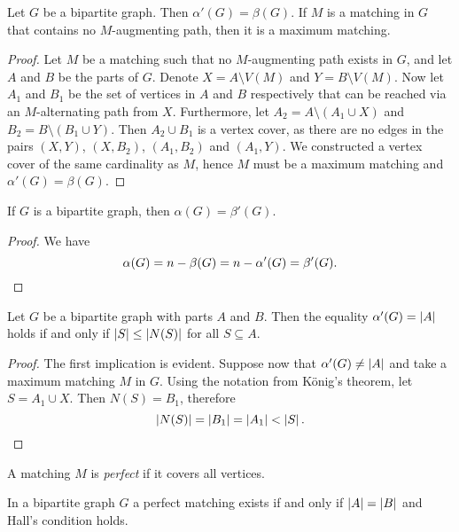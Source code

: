 \begin{izrek}[König]
Let $G$ be a bipartite graph. Then $\alpha'(G) = \beta(G)$. If $M$
is a matching in $G$ that contains no $M$-augmenting path, then it
is a maximum matching.
\end{izrek}

\begin{proof}
Let $M$ be a matching such that no $M$-augmenting path exists in
$G$, and let $A$ and $B$ be the parts of $G$. Denote
$X = A \setminus V(M)$ and $Y = B \setminus V(M)$. Now let $A_1$
and $B_1$ be the set of vertices in $A$ and $B$ respectively that
can be reached via an $M$-alternating path from $X$. Furthermore,
let $A_2 = A \setminus (A_1 \cup X)$ and
$B_2 = B \setminus (B_1 \cup Y)$. Then $A_2 \cup B_1$ is a vertex
cover, as there are no edges in the pairs $(X, Y)$, $(X, B_2)$,
$(A_1, B_2)$ and $(A_1, Y)$. We constructed a vertex cover of the
same cardinality as $M$, hence $M$ must be a maximum matching and
$\alpha'(G) = \beta(G)$.
\end{proof}

\begin{posledica}
If $G$ is a bipartite graph, then $\alpha(G) = \beta'(G)$.
\end{posledica}

\begin{proof}
We have
\[
\alpha(G) = n - \beta(G) = n - \alpha'(G) = \beta'(G). \qedhere
\]
\end{proof}

\begin{izrek}[Hall]
Let $G$ be a bipartite graph with parts $A$ and $B$. Then the
equality $\alpha'(G) = \left\lvert A\right\rvert$ holds if and only if
$\left\lvert S\right\rvert \leq \left\lvert N(S)\right\rvert$ for all $S \subseteq A$.
\end{izrek}

\begin{proof}
The first implication is evident. Suppose now that
$\alpha'(G) \ne \left\lvert A\right\rvert$ and take a maximum matching $M$ in $G$.
Using the notation from König's theorem, let $S = A_1 \cup X$.
Then $N(S) = B_1$, therefore
\[
\left\lvert N(S)\right\rvert = \left\lvert B_1\right\rvert = \left\lvert A_1\right\rvert < \left\lvert S\right\rvert. \qedhere
\]
\end{proof}

\begin{definicija}
A matching $M$ is \emph{perfect} if it
covers all vertices.
\end{definicija}

\begin{posledica}
In a bipartite graph $G$ a perfect matching exists if and only if
$\left\lvert A\right\rvert = \left\lvert B\right\rvert$ and Hall's condition holds.
\end{posledica}

